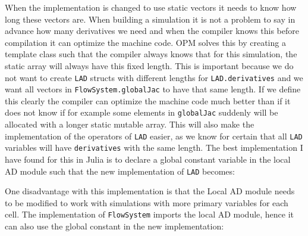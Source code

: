 When the implementation is changed to use static vectors it needs to know how long these vectors are. When building a simulation it is not a problem to say in advance how many derivatives we need and when the compiler knows this before compilation it can optimize the machine code. OPM solves this by creating a template class  such that the compiler always knows that for this simulation, the static array will always have this fixed length. This is important because we do not want to create \texttt{LAD} structs with different lengths for \texttt{LAD.derivatives} and we want all vectors in \texttt{FlowSystem.globalJac} to have that same length. If we define this clearly the compiler can optimize the machine code much better than if it does not know if for example some elements in \texttt{globalJac} suddenly will be allocated with a longer static mutable array. This will also make the implementation of the operators of \texttt{LAD} easier, as we know for certain that all \texttt{LAD} variables will have \texttt{derivatives} with the same length. The best implementation I have found for this in Julia is to declare a global constant variable in the local AD module such that the new implementation of \texttt{LAD} becomes:

One disadvantage with this implementation is that the Local AD module needs to be modified to work with simulations with more primary variables for each cell.  The implementation of \texttt{FlowSystem} imports the local AD module, hence it can also use the global constant in the new implementation:



